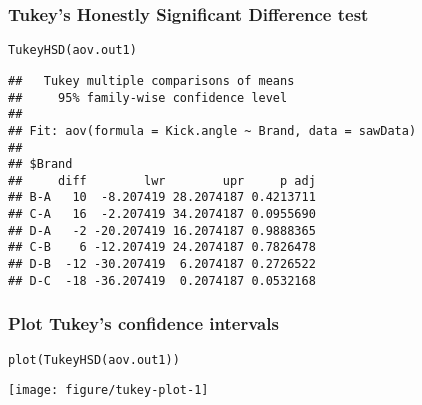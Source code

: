 \documentclass[color=usenames,dvipsnames]{beamer}\usepackage[]{graphicx}\usepackage[]{color}
\makeatletter
\newcommand{\hlstd}[1]{\textcolor[rgb]{0,0,0}{#1}}%
\newcommand{\hlkwd}[1]{\textcolor[rgb]{0.004,0.004,0.506}{#1}}%
\newenvironment{kframe}{%
 \def\at@end@of@kframe{}%
 \ifinner\ifhmode%
  \def\at@end@of@kframe{\end{minipage}}%
  \begin{minipage}{\columnwidth}%
 \fi\fi%
 \def\FrameCommand##1{\hskip\@totalleftmargin \hskip-\fboxsep
 \colorbox{shadecolor}{##1}\hskip-\fboxsep
     \hskip-\linewidth \hskip-\@totalleftmargin \hskip\columnwidth}%
 \MakeFramed {\advance\hsize-\width
   \@totalleftmargin\z@ \linewidth\hsize
   \@setminipage}}%
 {\par\unskip\endMakeFramed%
 \at@end@of@kframe}
\newenvironment{knitrout}{}{} %
\makeatother
\begin{document}





\begin{frame}[fragile]
  \frametitle{Tukey's Honestly Significant Difference test}
\begin{knitrout}\small
{}\color{fgcolor}\begin{kframe}
\begin{alltt}
\hlkwd{TukeyHSD}\hlstd{(aov.out1)}
\end{alltt}
\begin{verbatim}
##   Tukey multiple comparisons of means
##     95% family-wise confidence level
## 
## Fit: aov(formula = Kick.angle ~ Brand, data = sawData)
## 
## $Brand
##     diff        lwr        upr     p adj
## B-A   10  -8.207419 28.2074187 0.4213711
## C-A   16  -2.207419 34.2074187 0.0955690
## D-A   -2 -20.207419 16.2074187 0.9888365
## C-B    6 -12.207419 24.2074187 0.7826478
## D-B  -12 -30.207419  6.2074187 0.2726522
## D-C  -18 -36.207419  0.2074187 0.0532168
\end{verbatim}
\end{kframe}
\end{knitrout}
\end{frame}




\begin{frame}[fragile]
  \frametitle{Plot Tukey's confidence intervals}
  \tiny
\begin{knitrout}\footnotesize
{}\color{fgcolor}\begin{kframe}
\begin{alltt}
\hlkwd{plot}\hlstd{(}\hlkwd{TukeyHSD}\hlstd{(aov.out1))}
\end{alltt}
\end{kframe}
\end{knitrout}
\begin{center}
  \texttt{[image: figure/tukey-plot-1]}
\end{center}
\end{frame}
\end{document}
